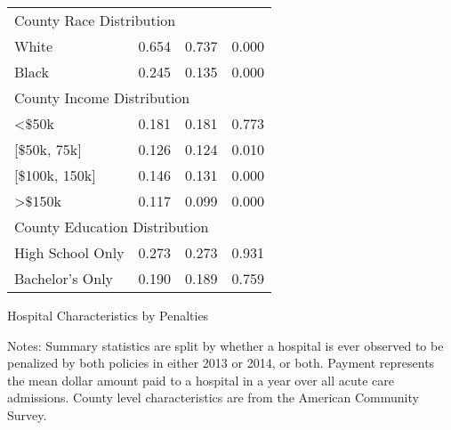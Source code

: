 \documentclass[12pt]{article}
\begin{document}
{\begin{tabular}{lccc}
\multicolumn{4}{l}{County Race Distribution}\\
\hspace{0.05in}White     &     0.654   &     0.737    &    0.000\\
\hspace{0.05in}Black    &     0.245  &      0.135   &     0.000\\
\multicolumn{4}{l}{County Income Distribution}\\
\hspace{0.05in}<$\$$50k   &    0.181    &    0.181      &  0.773\\
\hspace{0.05in}[$\$$50k, 75k]   &    0.126   &     0.124    &    0.010\\
\hspace{0.05in}[$\$$100k, 150k]       & 0.146   &    0.131  &      0.000\\
\hspace{0.05in}>$\$$150k   &    0.117   &     0.099 &       0.000\\
\multicolumn{4}{l}{County Education Distribution}\\
\hspace{0.05in}High School Only   &     0.273    &    0.273     &   0.931\\
\hspace{0.05in}Bachelor's Only      &     0.190   &     0.189      &  0.759\\
\hline
\end{tabular}
}
\setlength{\captionmargin}{.5 \textwidth} \addtolength{\captionmargin}{-.5\wd\gfxbox}
\begin{table}[!h]
\centering
\caption{Hospital Characteristics by Penalties}
\label{tab:bypenalty}
\usebox{\gfxbox}
\par
\begin{minipage}{\wd\gfxbox}
\footnotesize
Notes: Summary statistics are split by whether a hospital is ever observed to be penalized by both policies in either 2013 or 2014, or both. Payment represents the mean dollar amount paid to a hospital in a year over all acute care admissions.   County level characteristics are from the American Community Survey.
\end{minipage}
\end{table}
\end{document}
